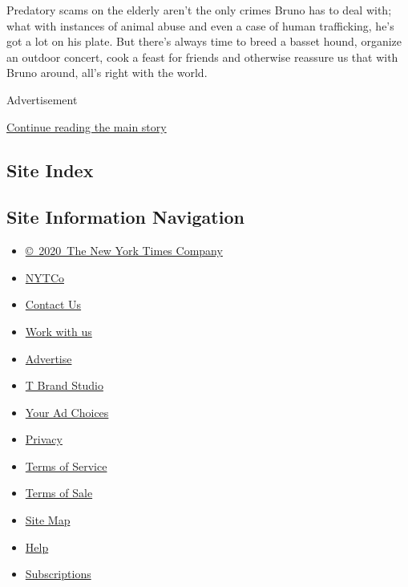 Predatory scams on the elderly aren't the only crimes Bruno has to deal
with; what with instances of animal abuse and even a case of human
trafficking, he's got a lot on his plate. But there's always time to
breed a basset hound, organize an outdoor concert, cook a feast for
friends and otherwise reassure us that with Bruno around, all's right
with the world.

Advertisement

\protect\hyperlink{after-bottom}{Continue reading the main story}

\hypertarget{site-index}{%
\subsection{Site Index}\label{site-index}}

\hypertarget{site-information-navigation}{%
\subsection{Site Information
Navigation}\label{site-information-navigation}}

\begin{itemize}
\tightlist
\item
  \href{https://help.nytimes3xbfgragh.onion/hc/en-us/articles/115014792127-Copyright-notice}{©~2020~The
  New York Times Company}
\end{itemize}

\begin{itemize}
\tightlist
\item
  \href{https://www.nytco.com/}{NYTCo}
\item
  \href{https://help.nytimes3xbfgragh.onion/hc/en-us/articles/115015385887-Contact-Us}{Contact
  Us}
\item
  \href{https://www.nytco.com/careers/}{Work with us}
\item
  \href{https://nytmediakit.com/}{Advertise}
\item
  \href{http://www.tbrandstudio.com/}{T Brand Studio}
\item
  \href{https://www.nytimes3xbfgragh.onion/privacy/cookie-policy\#how-do-i-manage-trackers}{Your
  Ad Choices}
\item
  \href{https://www.nytimes3xbfgragh.onion/privacy}{Privacy}
\item
  \href{https://help.nytimes3xbfgragh.onion/hc/en-us/articles/115014893428-Terms-of-service}{Terms
  of Service}
\item
  \href{https://help.nytimes3xbfgragh.onion/hc/en-us/articles/115014893968-Terms-of-sale}{Terms
  of Sale}
\item
  \href{https://spiderbites.nytimes3xbfgragh.onion}{Site Map}
\item
  \href{https://help.nytimes3xbfgragh.onion/hc/en-us}{Help}
\item
  \href{https://www.nytimes3xbfgragh.onion/subscription?campaignId=37WXW}{Subscriptions}
\end{itemize}
